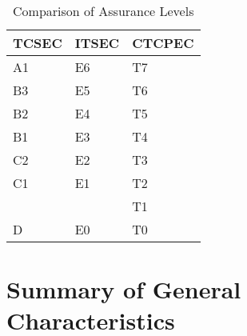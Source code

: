     \begin{table}[H]
    \begin{center}
    \begin{tabular}{|>{\sffamily}p{2cm}|>{\sffamily}p{2cm}|>{\sffamily}p{2cm}|} \hline
    \bfseries{TCSEC}   &   \bfseries{ITSEC}   &   \bfseries{CTCPEC}  \\ \hline \hline
    A1      &   E6      &   T7      \\ \hline
    B3      &   E5      &   T6      \\ \hline
    B2      &   E4      &   T5      \\ \hline
    B1      &   E3      &   T4      \\ \hline
    C2      &   E2      &   T3      \\ \hline
    C1      &   E1      &   T2      \\ \hline
            &           &   T1      \\ \hline
    D       &   E0      &   T0      \\ \hline
    \end{tabular}
    \end{center}
    \caption{Comparison of Assurance Levels} \label{table:assurance-levels}
    \end{table} 

\section{Summary of General Characteristics}

